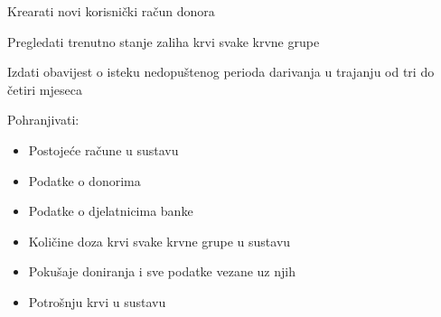 \begin{packed_enum}
\begin{packed_enum}
				\end{packed_enum}
				
				\item  {}
				
				\begin{packed_enum}
					
					\item Krearati novi korisnički račun donora
					\item Pregledati trenutno stanje zaliha krvi svake krvne grupe
					
				\end{packed_enum}
				
				\item  {}
				
				\begin{packed_enum}
					
					\item Izdati obavijest o isteku nedopuštenog perioda darivanja u trajanju od tri do četiri mjeseca
					
				\end{packed_enum}
				
				\item  {}
				
				\begin{packed_enum}
					
					\item Pohranjivati:
					
					    \begin{itemize}
					        \item Postojeće račune u sustavu
					        \item Podatke o donorima
					        \item Podatke o djelatnicima banke
					        \item Količine doza krvi svake krvne grupe u sustavu
					        \item Pokušaje doniranja i sve podatke vezane uz njih
					        \item Potrošnju krvi u sustavu
					    \end{itemize}
					
				\end{packed_enum}
				
			\end{packed_enum}
			
			\eject 
			

